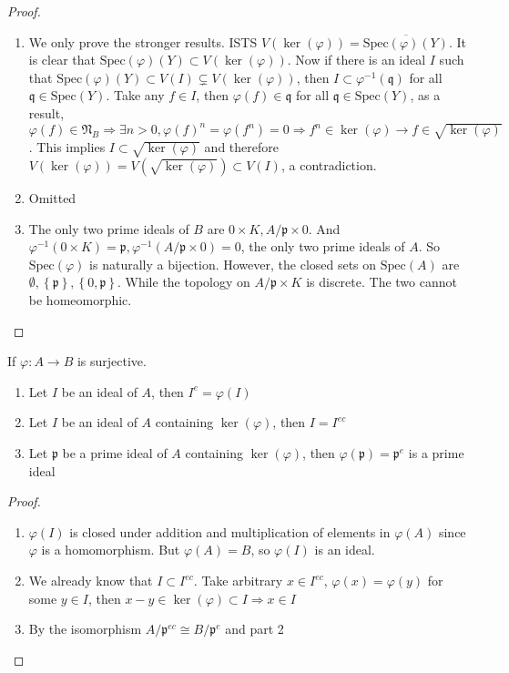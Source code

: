 \documentclass{solution}
\begin{document}
\begin{proof}
\begin{enumerate}
        \item We only prove the stronger results. ISTS $V(\ker (\varphi)) = \overline{\mathrm{Spec}(\varphi)(Y)}$. It is clear that $\mathrm{Spec}(\varphi)(Y) \subset V(\ker(\varphi))$. Now if there is an ideal $I$ such that $\mathrm{Spec}(\varphi)(Y) \subset V(I) \subsetneq V(\ker(\varphi))$, then $I \subset \varphi ^{-1}(\mathfrak{q})$ for all $\mathfrak{q} \in \mathrm{Spec}(Y)$. Take any $f \in I$, then $\varphi(f) \in \mathfrak{q}$ for all $\mathfrak{q} \in \mathrm{Spec}(Y)$, as a result, $\varphi(f) \in \mathfrak{N}_B \Rightarrow \exists n \gt 0, \varphi(f)^n = \varphi(f^n) = 0 \Rightarrow f^n \in \ker (\varphi) \rightarrow f \in \sqrt{\ker(\varphi)}$. This implies $I \subset \sqrt{\ker(\varphi)}$ and therefore $V(\ker (\varphi)) = V(\sqrt{\ker (\varphi)}) \subset V(I)$, a contradiction.
        
        \item Omitted
        \item The only two prime ideals of $B$ are $0 \times K, A / \mathfrak{p} \times 0$. And $\varphi ^{-1}(0 \times K) = \mathfrak{p}, \varphi ^{-1}(A / \mathfrak{p} \times 0) = 0$, the only two prime ideals of $A$. So $\mathrm{Spec}(\varphi)$ is naturally a bijection. However, the closed sets on $\mathrm{Spec}(A)$ are $\emptyset, \left\lbrace \mathfrak{p} \right\rbrace, \left\lbrace 0, \mathfrak{p} \right\rbrace$. While the topology on $A / \mathfrak{p} \times K$ is discrete. The two cannot be homeomorphic.
    \end{enumerate}
\end{proof}

\begin{lemma}
    If $\varphi: A \rightarrow B$ is surjective.
    \begin{enumerate}
        \item Let $I$ be an ideal of $A$, then $I^e = \varphi(I)$
        \item Let $I$ be an ideal of $A$ containing $\ker (\varphi)$, then $I = I^{ec}$
        \item Let $\mathfrak{p}$ be a prime ideal of $A$ containing $\ker (\varphi)$, then $\varphi(\mathfrak{p}) = \mathfrak{p}^e$ is a prime ideal
    \end{enumerate}
\end{lemma}

\begin{proof}
    \begin{enumerate}
        \item $\varphi(I)$ is closed under addition and multiplication of elements in $\varphi(A)$ since $\varphi$ is a homomorphism. But $\varphi(A) = B$, so $\varphi(I)$ is an ideal.
        \item We already know that $I \subset I^{ec}$. Take arbitrary $x \in I^{ec}$, $\varphi(x) = \varphi(y)$ for some $y \in I$, then $x - y \in \ker (\varphi) \subset I \Rightarrow x \in I$
        \item By the isomorphism $A / \mathfrak{p}^{ec} \cong B / \mathfrak{p}^e$ and part 2
    \end{enumerate}
\end{proof}
\end{document}

